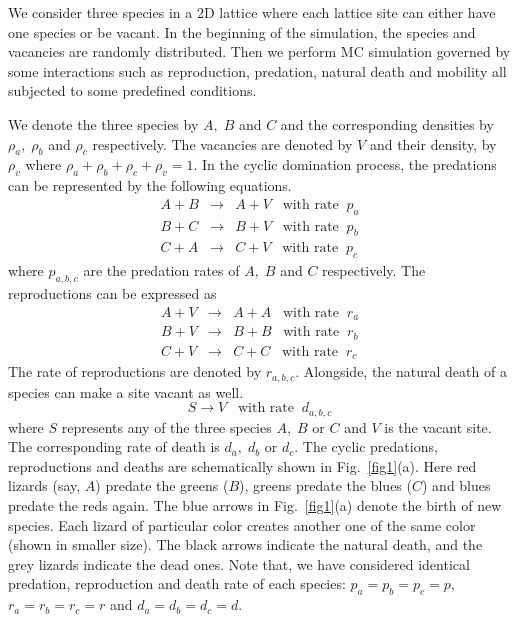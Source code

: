 \documentclass[aps, pre, twocolumn, amsmath, superscriptaddress,showkeys,showpacs]{revtex4-1}
\def\be{\begin{equation}}
\def\ee{\end{equation}}
\def\bea{\begin{eqnarray}}
\def\eea{\end{eqnarray}}
\begin{document}
	\noindent
	We consider three species in a 2D lattice where each lattice site can either have one species or be vacant. In the beginning of the simulation, the species and vacancies are randomly %
	{ distributed}. Then we perform MC simulation {governed by some interactions such as reproduction, predation, natural death and mobility all subjected to some predefined conditions}.
	\par {We denote the three species by $A,\;B$ and $C$ and the corresponding densities by $\rho_a,\; \rho_b$ and $\rho_c$ respectively. The vacancies are denoted by $V$ and their density, by $\rho_v$ where $\rho_a + \rho_b + \rho_c + \rho_v = 1$. In the cyclic domination process, the predations can be represented by the following equations.}   
	\bea
	A + B & \longrightarrow & A + V \;\;\; \mbox{with rate}\;\; p_a\nonumber \\
	B + C & \longrightarrow & B + V \;\;\; \mbox{with rate}\;\; p_b\nonumber \\
	C + A & \longrightarrow & C + V \;\;\; \mbox{with rate}\;\; p_c
	\label{predation}
	\eea 
	{where $p_{a,b,c}$ are the predation rates of $A,\;B$ and $C$ respectively. The reproductions can be expressed as}
   \bea
	A + V & \longrightarrow & A + A \;\;\; \mbox{with rate}\;\; r_a\nonumber \\
	B + V & \longrightarrow & B + B \;\;\; \mbox{with rate}\;\; r_b\nonumber \\
	C + V & \longrightarrow & C + C \;\;\; \mbox{with rate}\;\; r_c
	\label{reproduction}
	\eea
	{The rate of reproductions are denoted by $r_{a,b,c}$. Alongside, the natural death of a species can make a site vacant as well.}
	\be
	S \longrightarrow  V \;\;\; \mbox{with rate}\;\; d_{a,b,c} 
	\label{death}
	\ee
	{where $S$ represents any of the three species $A,\;B$ or $C$ and $V$ is the vacant site. The corresponding rate of death is $d_a,\;d_b$ or $d_c$. The cyclic predations, reproductions and deaths are schematically shown} in Fig.\ \ref{fig1}(a). Here red lizards (say, $A$) predate the greens ($B$), greens predate the blues ($C$) and blues predate the reds again. The blue arrows in Fig.\ \ref{fig1}(a) denote the birth of new species. Each lizard of  particular color creates another one of the same color (shown in smaller size). The black arrows indicate the natural death, and the grey lizards indicate the dead ones. Note that, we have considered identical predation, reproduction and death rate of each species: $p_a=p_b=p_c=p$, $r_a=r_b=r_c=r$ and $d_a=d_b=d_c=d$.	
		
\end{document}
